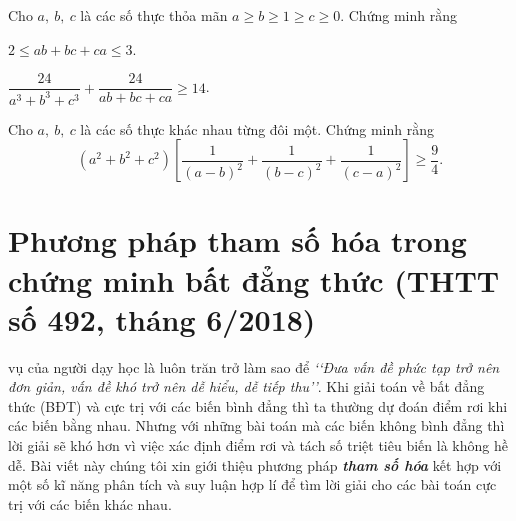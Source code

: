 {\begin{bt}
	Cho $ a,\ b,\ c $ là các số thực thỏa mãn $ a\geq b\geq 1\geq c\geq 0 $. Chứng minh rằng
	\begin{enumEX}{2}
		\item $ 2\leq ab+bc+ca\leq 3 $.
		\item $ \dfrac{24}{a^{3}+b^{3}+c^{3}}+\dfrac{24}{ab+bc+ca}\geq 14 $.
	\end{enumEX}
\end{bt}
\begin{bt}%
	Cho $ a,\ b,\ c $ là các số thực khác nhau từng đôi một. Chứng minh rằng
	\[ 
	(a^{2}+b^{2}+c^{2})\left[\dfrac{1}{(a-b)^{2}}+\dfrac{1}{(b-c)^{2}}+\dfrac{1}{(c-a)^{2}}\right]\geq \dfrac{9}{4}.
	\]
\end{bt}
\section{Phương pháp tham số hóa trong chứng minh bất đẳng thức (THTT số 492, tháng 6/2018)}
\begin{center}
	\textbf{\color{violet}{MAI VĂN NĂM\\
			(GV THCS Khánh Hồng, Yên Khánh, Ninh Bình)}}
\end{center}
 vụ của người dạy học là luôn trăn trở làm sao để \textit{\lq \lq Đưa vấn đề phức tạp trở nên đơn giản, vấn đề khó trở nên dễ hiểu, dễ tiếp thu\rq \rq}. Khi giải toán về bất đẳng thức (BĐT) và cực trị với các biến bình đẳng thì ta thường dự đoán điểm rơi khi các biến bằng nhau. Nhưng với những bài toán mà các biến không bình đẳng thì lời giải sẽ khó hơn vì việc xác định điểm rơi và tách số triệt tiêu biến là không hề dễ. Bài viết này chúng tôi xin giới thiệu phương pháp \textbf{\textit{tham số hóa}} kết hợp với một số kĩ năng phân tích và suy luận hợp lí để tìm lời giải cho các bài toán cực trị với các biến khác nhau.


}

